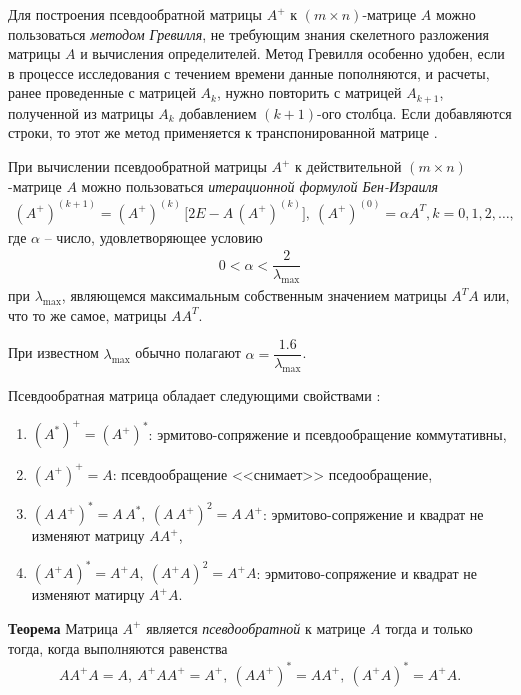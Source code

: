 \documentclass[%
	11pt,
	a4paper,
	utf8,
		]{article}
\begin{document}
Для построения псевдообратной матрицы $ A^+ $ к  $ (m \times n) $-матрице $ A $ можно пользоваться \emph{методом Гревилля}, не требующим знания скелетного разложения матрицы $ A $ и вычисления определителей. Метод Гревилля особенно удобен, если в процессе исследования с течением времени данные пополняются, и расчеты, ранее проведенные с матрицей $ A_k $, нужно повторить с матрицей $ A_{k+1} $, полученной из матрицы $ A_k $ добавлением $ (k+1) $-ого столбца. Если добавляются строки, то этот же метод применяется к транспонированной матрице \cite[]{shevtsov:linal-2012}.

При вычислении псевдообратной матрицы $ A^+ $ к действительной $ (m \times n) $-матрице $ A $ можно пользоваться \emph{итерационной формулой Бен-Израиля} \cite[]{shevtsov:linal-2012}
\begin{align*}
	(A^+)^{(k + 1)} = (A^+)^{(k)} \, \big[ 2 E - A \, (A^+)^{(k)} \big], \ (A^+)^{(0)} = \alpha A^T, k = 0, 1, 2, \ldots,
\end{align*}
где $ \alpha $ -- число, удовлетворяющее условию
\begin{align*}
	0 < \alpha < \dfrac{2}{\lambda_{\max}}
\end{align*}
при $ \lambda_{\max} $, являющемся максимальным собственным значением матрицы $ A^T A $ или, что то же самое, матрицы $ A A^T $. 

При известном $ \lambda_{\max} $ обычно полагают $ \alpha = \dfrac{1.6}{\lambda_{\max}} $.

Псевдообратная матрица обладает следующими свойствами \cite[]{shevtsov:linal-2012}:
\begin{enumerate}
	\item $ (A^*)^+ = (A^+)^* $: эрмитово-сопряжение и псевдообращение коммутативны,
	
	\item $ (A^+)^+ = A $: псевдообращение <<снимает>> пседообращение,
	
	\item $ (A \, A^+)^* = A \, A^*, \ (A \, A^+)^2 = A \, A^+ $: эрмитово-сопряжение и квадрат не изменяют матрицу $ A A^+ $,
	
	\item $ (A^+ A)^* = A^+ A, \ (A^+ A)^2 = A^+ A $: эрмитово-сопряжение и квадрат не изменяют матирцу $ A^+ A $.
\end{enumerate}

\textbf{Теорема} Матрица $ A^+ $ является \emph{псевдообратной} к матрице $ A $ тогда и только тогда, когда выполняются равенства
\begin{align*}
	A A^+ A = A, \ A^+ A A^+ = A^+, \ (A A^+)^* = A A^+, \ (A^+ A)^* = A^+ A.
\end{align*}
\end{document}
